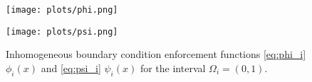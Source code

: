 \documentclass[oneside,final]{csri23}
\newcommand{\todo}[1]{\textcolor{blue}{TODO: #1}}
\begin{document}




\begin{figure}
    \begin{minipage}{0.49\linewidth}
        \texttt{[image: plots/phi.png]}
    \end{minipage}
    \begin{minipage}{0.49\linewidth}
        \texttt{[image: plots/psi.png]}
    \end{minipage}
    \caption{Inhomogeneous boundary condition enforcement functions \eqref{eq:phi_i} $\phi_i(x)$
    and \eqref{eq:psi_i} $\psi_i(x)$ for the interval $\Omega_i = (0,1)$.}
    \label{fig:psi}
\end{figure}
\end{document}
